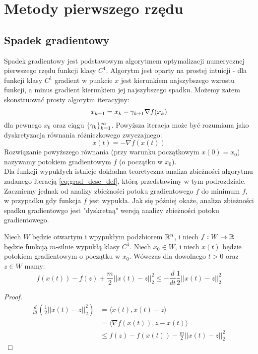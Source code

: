 \documentclass[10pt,a4paper,draft]{report}
\begin{document}
\chapter{Metody pierwszego rzędu}
\section{Spadek gradientowy}
Spadek gradientowy jest podstawowym algorytmem optymalizacji numerycznej pierwszego rzędu funkcji klasy $C^1$.
Algorytm jest oparty na prostej intuicji - dla funkcji klasy $C^1$ gradient w punkcie $x$ jest kierunkiem najszybszego wzrostu funkcji, a minus gradient kierunkiem jej najszybszego spadku. Możemy zatem skonstruować prosty algorytm iteracyjny:
\begin{equation} \label{eq:grad_desc_def}
x_{k+1} = x_k - \gamma_{k+1} \nabla f(x_k)
\end{equation}
dla pewnego $x_0$ oraz ciągu $\{\gamma_{k} \}_{k=1}^{\infty}$.
Powyższa iteracja może być rozumiana jako dyskretyzacja równania różniczkowego zwyczajnego:
\[
\dot{x}(t) = - \nabla f(x(t))
\]
Rozwiązanie powyższego równania (przy warunku początkowym $x(0) = x_0$) nazywamy potokiem gradientowym $f$ (o początku w $x_0$).
\\
Dla funkcji wypukłych istnieje dokładna teoretyczna analiza zbieżności algorytmu zadanego iteracją \ref{eq:grad_desc_def}, którą przedstawimy w tym podrozdziale. Zaczniemy jednak od analizy zbieżności potoku gradientowego $f$ do minimum $f$, w przypadku gdy funkcja $f$ jest wypukła. Jak się później okaże, analiza zbieżności spadku gradientowgo jest "dyskretną" wersją analizy zbieżności potoku gradientowego.
\begin{lemma}
Niech $W$ będzie otwartym i wpypukłym podzbiorem $\mathbb{R}^n$, i niech $f : W \rightarrow \mathbb{R}$ będzie funkcją $m$-silnie wypukłą klasy $C^1$. Niech $x_0 \in W$, i niech $x(t)$ będzie potokiem gradientowym o początku w $x_0$. Wówczas dla dowolnego $t > 0$ oraz $z \in W$ mamy:
\[
f(x(t)) - f(z) + \frac{m}{2}||x(t) - z||_2^2 \leq - \frac{d}{dt} \frac{1}{2} ||x(t) - z||_2^2
\] 
\end{lemma}
\begin{proof}
\[
\begin{aligned}
\frac{d}{dt} \left( \frac{1}{2}||x(t) - z||_2^2 \right) & = \langle \dot{x}(t), x(t) - z \rangle \\
& = \langle \nabla f(x(t)), z - x(t) \rangle \\
& \leq f(z) - f(x(t)) - \frac{m}{2}||x(t) - z||_2^2
\end{aligned}
\]
\end{proof}
\end{document}
